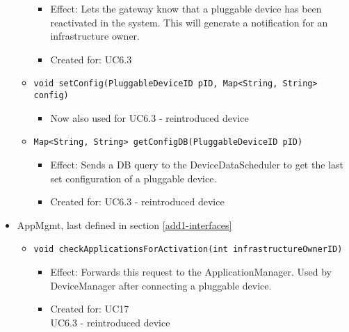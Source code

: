 \begin{itemize}
\begin{itemize}
                    \begin{itemize}
                        \item Effect: Lets the gateway know that a pluggable device has been reactivated in the system.
                              This will generate a notification for an infrastructure owner.
                        \item Created for: UC6.3
                    \end{itemize}
                \item \texttt{void setConfig(PluggableDeviceID pID, Map<String, String> config)}
                    \begin{itemize}
                        \item Now also used for UC6.3 - reintroduced device
                    \end{itemize}
                \item \texttt{Map<String, String> getConfigDB(PluggableDeviceID pID)}
                    \begin{itemize}
                        \item Effect: Sends a DB query to the DeviceDataScheduler to get the last set configuration of a pluggable device.
                        \item Created for: UC6.3 - reintroduced device
                    \end{itemize}
            \end{itemize}

            \item AppMgmt, last defined in section \ref{add1-interfaces}
                \begin{itemize}
                    \item \texttt{void checkApplicationsForActivation(int infrastructureOwnerID)}
                        \begin{itemize}
                			\item Effect: Forwards this request to the ApplicationManager.
                                  Used by DeviceManager after connecting a pluggable device.
                			\item Created for: UC17 \\  UC6.3 - reintroduced device
                        \end{itemize}
                \end{itemize}
        \end{itemize}

